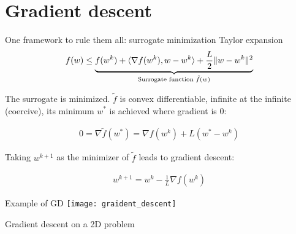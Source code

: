 

\section{Gradient descent}


\begin{frame}{One framework to rule them all: surrogate minimization}
    \alert{Taylor expansion}
    \begin{align*}
        f(w)
        \leq
        \underbrace{f(w^{k})
        + \langle \nabla f (w^{k}), w - w^{k} \rangle
        + \frac{L}{2} \lVert {w - w^{k}} \rVert^2}_{\text{Surrogate function } \tilde{f}(w)}
    \end{align*}

    \pause

    The \alert{surrogate} is minimized.
    $\tilde{f}$ is convex differentiable, infinite at the infinite (coercive), its minimum $w^*$ is achieved where gradient is 0:

    \begin{align*}
        0 = \nabla \tilde{f} (w^*) = \nabla f (w^{k}) + L (w^* - w^{k})
    \end{align*}

    \pause
    Taking $w^{k+1}$ as the minimizer of $\tilde{f}$ leads to \alert{gradient descent}:

    \begin{align*}
        w^{k+1} = w^k - \frac{1}{L} \nabla f (w^k)
    \end{align*}
\end{frame}


\begin{frame}{Example of GD}
    \centering
    \texttt{[image: graident\_descent]}

    Gradient descent on a 2D problem
\end{frame}

